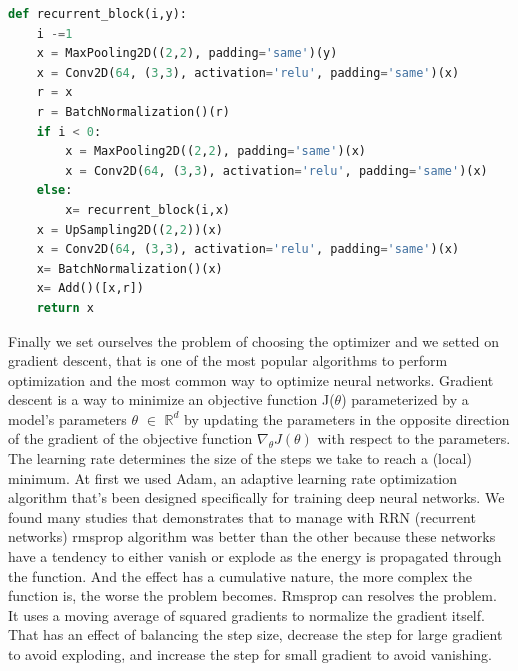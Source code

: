 \documentclass[%
 reprint,
 amsmath,amssymb,
 aps,
]{revtex4-1}
\begin{document}
\begin{lstlisting}[linewidth=\columnwidth,breaklines=true,language=python]
def recurrent_block(i,y):
    i -=1
    x = MaxPooling2D((2,2), padding='same')(y)
    x = Conv2D(64, (3,3), activation='relu', padding='same')(x)
    r = x 
    r = BatchNormalization()(r)
    if i < 0:
        x = MaxPooling2D((2,2), padding='same')(x)
        x = Conv2D(64, (3,3), activation='relu', padding='same')(x)          
    else:    
        x= recurrent_block(i,x)     
    x = UpSampling2D((2,2))(x)
    x = Conv2D(64, (3,3), activation='relu', padding='same')(x) 
    x= BatchNormalization()(x)
    x= Add()([x,r])
    return x 

\end{lstlisting}
Finally we set ourselves the problem of choosing the optimizer and we setted on gradient descent, that is one of the most popular algorithms to perform optimization and the most common way to optimize neural networks.
Gradient descent is a way to minimize an objective function J($\theta$) parameterized by a model's parameters $\theta$ $\in$ $\mathbb{R}^{d}$ by updating the parameters in the opposite direction of the gradient of the objective function \(\nabla_{\theta}J(\theta)\) with respect to the parameters. The learning rate determines the size of the steps we take to reach a (local) minimum. 
At first we used Adam, an adaptive learning rate optimization algorithm that’s been designed specifically for training deep neural networks.
We found many studies that demonstrates that to manage with RRN (recurrent networks) rmsprop algorithm was better than the other because these networks have a tendency to either vanish or explode as the energy is propagated through the function. And the effect has a cumulative nature, the more complex the function is, the worse the problem becomes.
Rmsprop can resolves the problem. It uses a moving average of squared gradients to normalize the gradient itself. That has an effect of balancing the step size, decrease the step for large gradient to avoid exploding, and increase the step for small gradient to avoid vanishing.
\end{document}
